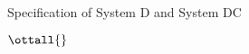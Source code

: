 \documentclass{article}
\begin{document}
Specification of System D and System DC

$\ottall{}$
\end{document}
